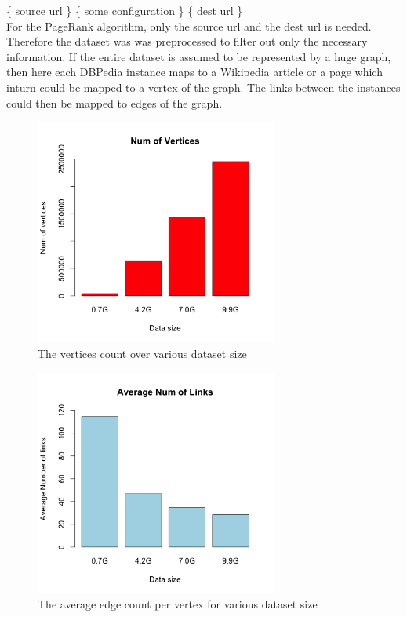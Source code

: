 \documentclass{article}
\begin{document}
\centering
\{ source url \} \{ some configuration \} \{ dest url \} \\

For the PageRank algorithm, only the source url and the dest url is
needed. Therefore the dataset was was preprocessed to filter out only the
necessary information.  If the entire dataset is assumed to be represented by a
huge graph, then here each DBPedia instance maps to a Wikipedia article or a
page which inturn could be mapped to a vertex of the graph. The links
between the instances could then be mapped to edges of the graph.

\begin{figure}
\centering
  \includegraphics[width=80mm]{images/numVertices.png}
  \caption{The vertices count over various dataset size}
  \label{fig:numvertices}
\end{figure}

\begin{figure} 
  \centering
  \includegraphics[width=80mm]{images/numLinks.png}
  \caption{The average edge count per vertex for various dataset size}
  \label{fig:numlinks}
\end{figure}
\end{document}
